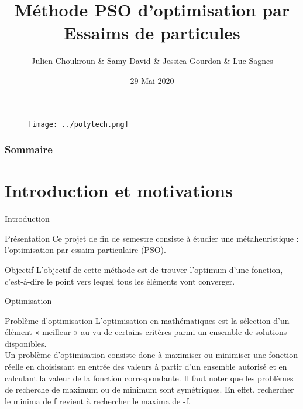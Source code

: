 \documentclass{beamer}
\title{Méthode PSO d’optimisation par Essaims de particules}
\author{Julien Choukroun \& Samy David \& Jessica Gourdon \& Luc Sagnes}
\institute{Polytech Nice Sophia}
\date{29 Mai 2020}
\begin{document}
\begin{frame}
  \titlepage
  \begin{figure}
    \begin{center}
      \texttt{[image: ../polytech.png]} 
    \end{center}
  \end{figure}
\end{frame}

\begin{frame}
  \frametitle{Sommaire}
  \tableofcontents
\end{frame} 

\section{Introduction et motivations}
  \begin{frame}{Introduction}
    \begin{block}{\Large Présentation}
      \large Ce projet de fin de semestre consiste à étudier une métaheuristique :  l’optimisation par essaim particulaire (PSO).
    \end{block}\pause
    \begin{block}{\Large Objectif}
      \large L’objectif de cette méthode est de trouver l’optimum d’une fonction, c’est-à-dire le point vers lequel tous les éléments vont converger.
    \end{block}
  \end{frame}

  \begin{frame}{Optimisation}
    \begin{block}{\Large Problème d'optimisation}
      L’optimisation en mathématiques est la sélection d'un élément « meilleur » au vu de certains critères parmi un ensemble de solutions disponibles. \\ 
      Un problème d'optimisation consiste donc à maximiser ou minimiser une fonction réelle en choisissant en entrée des valeurs à partir d'un ensemble autorisé et en calculant la valeur de la fonction correspondante. Il faut noter que les problèmes de recherche de maximum ou de minimum sont symétriques. En effet, rechercher le minima de f revient à rechercher le maxima de -f. 
    \end{block}
  \end{frame}
\end{document}
